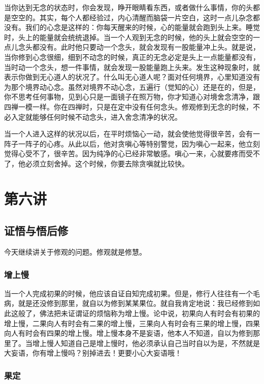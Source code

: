 \documentclass{book}
\begin{document}
当你达到无念的状态时，你会发现，睁开眼睛看东西，或者做什么事情，你的头都是空空的。其实，每个人都经验过，内心清醒而脑袋一片空白，这时一点儿杂念都没有。我们的心念是这样的：你每天醒来的时候，心的能量就会跑到头上来。睡觉时，头上的能量就会统统退掉。当一个人观到无念的时候，他的头上就会空空的一点儿念头都没有。此时他只要动一个念头，就会发现有一股能量冲上头。就是说，当你修到心念很细，细到不动念的时候，真正的无念必定是头上一点能量都没有，当时动一个念头，想一件事情，就会发现一股能量跑上头来。发生这种现象时，就表示你做到无心道人的状况了。什么叫无心道人呢？面对任何境界，心里知道没有为那个境界动心念。虽然对境界不动心念，五遍行（觉知的心）还是在的，但是，你不思考任何事物，见到心只是一面镜子在照万物，你才知道心对境舍念清净，跟四禅一模一样。你在四禅时，只是在定中没有任何念头。修观修到无念的时候，不必入定就能够任何时候不动念头，进入舍念清净的状况。

当一个人进入这样的状况以后，在平时烦恼心一动，就会使他觉得很辛苦，会有一阵子一阵子的心疼。从此以后，他对贪嗔心等特别警觉，因为嗔心一起来，他立刻觉得心受不了，很辛苦。因为纯净的心已经非常敏感。嗔心一来，心就要疼而受不了，他必须立刻舍掉。这个时候，你要去除贪嗔就比较快。

\chapter{第六讲}

\section{证悟与悟后修}

今天继续讲关于修观的问题。修观就是修慧。

\subsection{增上慢}

当一个人完成初果的时候，他应该自证自知完成初果。但是，修行人往往有一个毛病，就是还没修到那里，就自以为修到某某果位。就自我肯定地说：我已经修到如此这般了，佛法把未证谓证的烦恼称为增上慢。论中说，初果向人有时会有初果的增上慢，二果向人有时会有二果的增上慢，三果向人有时会有三果的增上慢，四果向人有时会有四果的增上慢。增上慢本身不是妄语，他本人不知道，自以为修到那里了。当增上慢人知道自己是增上慢时，他必须承认自己当时自以为是，不然就是大妄语，你有增上慢吗？别掉进去！更要小心大妄语哦！

\subsection{果定}
\end{document}
